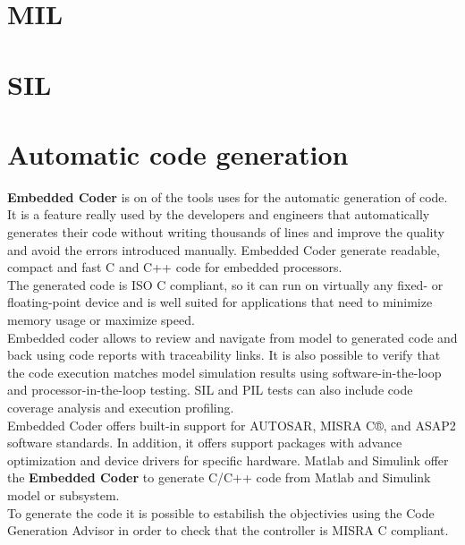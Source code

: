 \documentclass[12pt,a4paper]{report}
\begin{document}
\section{MIL}
\section{SIL}
\section{Automatic code generation}
\textbf{Embedded Coder} is on of the tools uses for the automatic generation of code. It is a feature really used by the developers and engineers that automatically generates their code without writing thousands of lines and improve the quality and avoid the errors introduced manually. 
Embedded Coder generate readable, compact and fast C and C++ code for embedded processors. \\
The generated code is ISO C compliant, so it can run on virtually any fixed- or floating-point device and is well suited for applications that need to minimize memory usage or maximize speed. \\
Embedded coder allows to review and navigate from model to generated code and back using code reports with traceability links. It is also possible to verify that the code execution matches model simulation results using software-in-the-loop and processor-in-the-loop testing. SIL and PIL tests can also include code coverage analysis and execution profiling. \\
Embedded Coder offers built-in support for AUTOSAR, MISRA C®, and ASAP2 software standards. In addition, it offers support packages with advance optimization and device drivers for specific hardware.
Matlab and Simulink offer the \textbf{Embedded Coder} to generate C/C++ code from Matlab and Simulink model or subsystem. \\
To generate the code it is possible to estabilish the objectivies using the Code Generation Advisor in order to check that the controller is MISRA C compliant.\\
\end{document}
